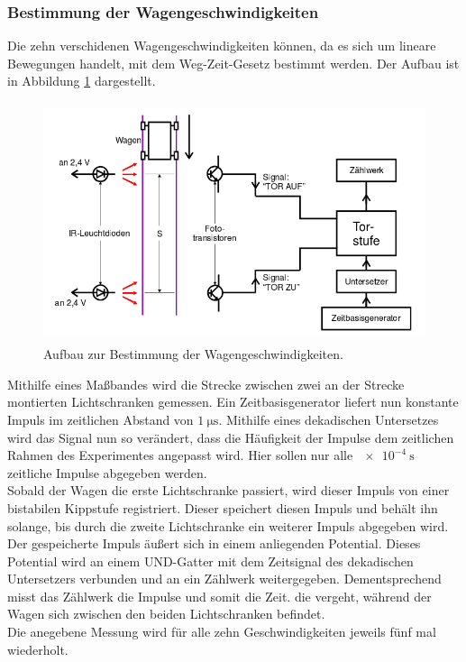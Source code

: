 \subsubsection{Bestimmung der Wagengeschwindigkeiten}
\label{sec:d1}
Die zehn verschidenen Wagengeschwindigkeiten können, da es sich um lineare Bewegungen handelt, mit dem Weg-Zeit-Gesetz bestimmt werden.
Der Aufbau ist in Abbildung \ref{tfig:1} dargestellt.
\begin{figure}
  \centering
  \includegraphics[height=7cm]{aufbau1.png}
  \caption{Aufbau zur Bestimmung der Wagengeschwindigkeiten.}
  \label{tfig:1}
\end{figure}
Mithilfe eines Maßbandes wird die Strecke zwischen zwei an der Strecke montierten Lichtschranken gemessen.
Ein Zeitbasisgenerator liefert nun konstante Impuls im zeitlichen Abstand von $\SI{1}{\micro\second}$.
Mithilfe eines dekadischen Untersetzes wird das Signal nun so verändert, dass die Häufigkeit der Impulse dem zeitlichen Rahmen des Experimentes angepasst wird.
Hier sollen nur alle $\SI{e-4}{\second}$ zeitliche Impulse abgegeben werden. \\
Sobald der Wagen die erste Lichtschranke passiert, wird dieser Impuls von einer bistabilen Kippstufe registriert.
Dieser speichert diesen Impuls und behält ihn solange, bis durch die zweite Lichtschranke ein weiterer Impuls abgegeben wird.
Der gespeicherte Impuls äußert sich in einem anliegenden Potential.
Dieses Potential wird an einem UND-Gatter mit dem Zeitsignal des dekadischen Untersetzers verbunden und an ein Zählwerk weitergegeben.
Dementsprechend misst das Zählwerk die Impulse und somit die Zeit. die vergeht, während der Wagen sich zwischen den beiden Lichtschranken befindet.\\
Die anegebene Messung wird für alle zehn Geschwindigkeiten jeweils fünf mal wiederholt.

